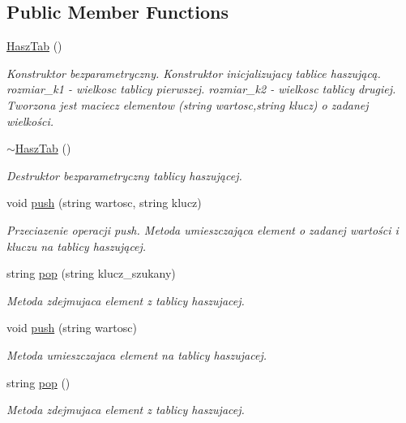 \subsection*{Public Member Functions}
\begin{DoxyCompactItemize}
\item 
\hyperlink{a00012_a8c439035d939ca124f6bfdcec24d31a6}{Hasz\+Tab} ()
\begin{DoxyCompactList}\small\item\em Konstruktor bezparametryczny. Konstruktor inicjalizujacy tablice haszującą. rozmiar\+\_\+k1 -\/ wielkosc tablicy pierwszej. rozmiar\+\_\+k2 -\/ wielkosc tablicy drugiej. Tworzona jest maciecz elementow (string wartosc,string klucz) o zadanej wielkości. \end{DoxyCompactList}\item 
\hyperlink{a00012_ad2ec227290ea1e25bc5fa8a7bd6d67fa}{$\sim$\+Hasz\+Tab} ()
\begin{DoxyCompactList}\small\item\em Destruktor bezparametryczny tablicy haszującej. \end{DoxyCompactList}\item 
void \hyperlink{a00012_a6c09fe064d3e5dfe99a075ed5db2b33f}{push} (string wartosc, string klucz)
\begin{DoxyCompactList}\small\item\em Przeciazenie operacji push. Metoda umieszczająca element o zadanej wartości i kluczu na tablicy haszującej. \end{DoxyCompactList}\item 
string \hyperlink{a00012_a7eedb12f1f29e243b7cc7616999a93de}{pop} (string klucz\+\_\+szukany)
\begin{DoxyCompactList}\small\item\em Metoda zdejmujaca element z tablicy haszujacej. \end{DoxyCompactList}\item 
void \hyperlink{a00012_a91805f33da69af9e86c7e366f3d5bb05}{push} (string wartosc)
\begin{DoxyCompactList}\small\item\em Metoda umieszczajaca element na tablicy haszujacej. \end{DoxyCompactList}\item 
string \hyperlink{a00012_a179ed12fcf0f5b5d0ad98f5e9d1eff61}{pop} ()
\begin{DoxyCompactList}\small\item\em Metoda zdejmujaca element z tablicy haszujacej. \end{DoxyCompactList}\item 

\end{DoxyCompactItemize}
